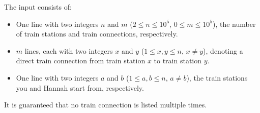 
    The input consists of:
	\begin{itemize}
		\item One line with two integers $n$ and $m$ ($2 \leq n \leq 10^5$, $0 \leq m \leq 10^5$), the number of train stations and train connections, respectively.
		\item $m$ lines, each with two integers $x$ and $y$ ($1 \leq x, y \leq n$, $x \neq y$), denoting a direct train connection from train station $x$ to train station $y$.
		\item One line with two integers $a$ and $b$ ($1 \leq a,b \leq n$, $a \neq b$), the train stations you and Hannah\xspace start from, respectively.
	\end{itemize}
	It is guaranteed that no train connection is listed multiple times.
